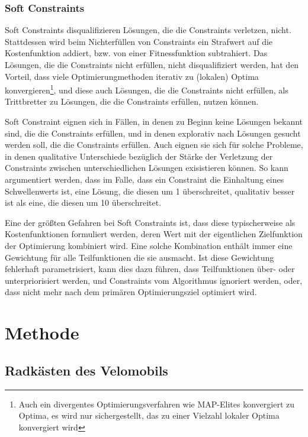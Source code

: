 \subsubsection{Soft Constraints}
Soft Constraints disqualifizieren Lösungen, die die Constraints verletzen, nicht.
Stattdessen wird beim Nichterfüllen von Constraints ein Strafwert auf die Kostenfunktion addiert, bzw. von einer Fitnessfunktion subtrahiert.
Das Lösungen, die die Constraints nicht erfüllen, nicht disqualifiziert werden, hat den Vorteil, dass viele Optimierungmethoden iterativ zu (lokalen) Optima konvergieren\footnote{Auch ein divergentes Optimierungsverfahren wie MAP-Elites konvergiert zu Optima, es wird nur sichergestellt, das zu einer Vielzahl lokaler Optima konvergiert wird}, 
und diese auch Lösungen, die die Constraints nicht erfüllen, als Trittbretter zu Lösungen, die die Constraints erfüllen, nutzen können.

Soft Constraint eignen sich in Fällen, in denen zu Beginn keine Lösungen bekannt sind, die die Constraints erfüllen, und in denen explorativ nach Lösungen gesucht werden soll, die die Constraints erfüllen.
Auch eignen sie sich für solche Probleme, in denen qualitative Unterschiede bezüglich der Stärke der Verletzung der Constraints zwischen unterschiedlichen Lösungen exisistieren können.
So kann argumentiert werden, dass im Falle, dass ein Constraint die Einhaltung eines Schwellenwerts ist, eine Lösung, die diesen um 1 überschreitet, qualitativ besser ist als eine, die diesen um 10 überschreitet.

Eine der größten Gefahren bei Soft Constraints ist, dass diese typischerweise als Kostenfunktionen formuliert werden, deren Wert mit der eigentlichen Zielfunktion der Optimierung kombiniert wird.
Eine solche Kombination enthält immer eine Gewichtung für alle Teilfunktionen die sie ausmacht.
Ist diese Gewichtung fehlerhaft parametrisiert, kann dies dazu führen, dass Teilfunktionen über- oder unterpriorisiert werden, und Constraints vom Algorithmus ignoriert werden, oder, dass nicht mehr nach dem primären Optimierungsziel optimiert wird.




\section{Methode}

\subsection{Radkästen des Velomobils}

